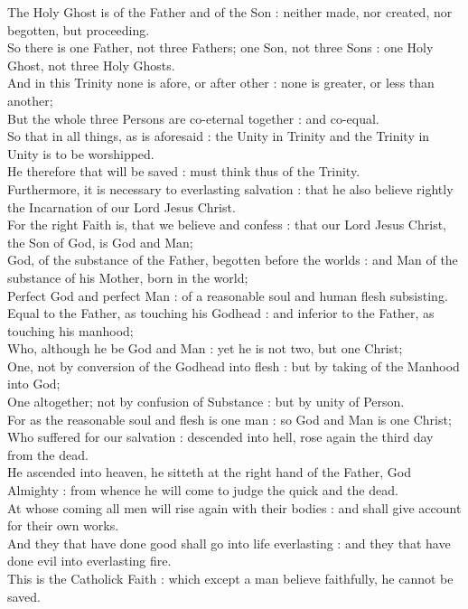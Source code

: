 The Holy Ghost is of the Father and of the Son : neither made, nor created, nor begotten, but proceeding.\\
So there is one Father, not three Fathers; one Son, not three Sons : one Holy Ghost, not three Holy Ghosts.\\
And in this Trinity none is afore, or after other : none is greater, or less than another;\\
But the whole three Persons are co-eternal together : and co-equal.\\
So that in all things, as is aforesaid : the Unity in Trinity and the Trinity in Unity is to be worshipped.\\
He therefore that will be saved : must think thus of the Trinity.\\
Furthermore, it is necessary to everlasting salvation : that he also believe rightly the Incarnation of our Lord Jesus Christ.\\
For the right Faith is, that we believe and confess : that our Lord Jesus Christ, the Son of God, is God and Man;\\
God, of the substance of the Father, begotten before the worlds : and Man of the substance of his Mother, born in the world;\\
Perfect God and perfect Man : of a reasonable soul and human flesh subsisting.\\
Equal to the Father, as touching his Godhead : and inferior to the Father, as touching his manhood;\\
Who, although he be God and Man : yet he is not two, but one Christ;\\
One, not by conversion of the Godhead into flesh : but by taking of the Manhood into God;\\
One altogether; not by confusion of Substance : but by unity of Person.\\
For as the reasonable soul and flesh is one man : so God and Man is one Christ;\\
Who suffered for our salvation : descended into hell, rose again the third day from the dead.\\
He ascended into heaven, he sitteth at the right hand of the Father, God Almighty : from whence he will come to judge the quick and the dead.\\
At whose coming all men will rise again with their bodies : and shall give account for their own works.\\
And they that have done good shall go into life everlasting : and they that have done evil into everlasting fire.\\
This is the Catholick Faith : which except a man believe faithfully, he cannot be saved.\\

